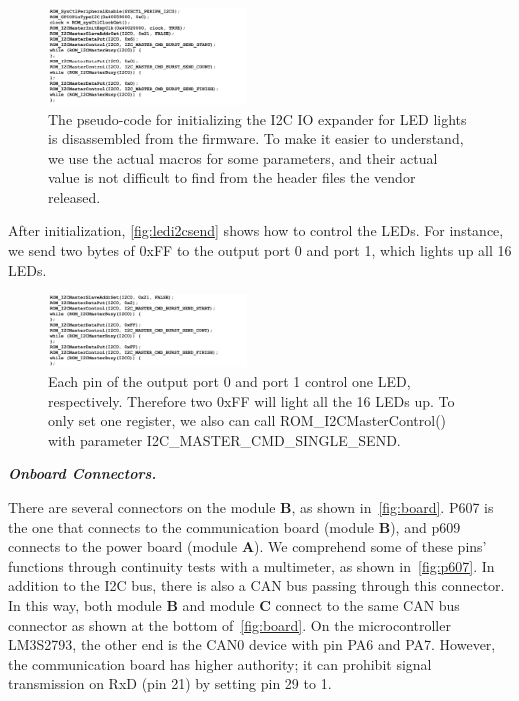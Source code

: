 \begin{figure}[th]
	\includegraphics[width=0.47\textwidth]{figures/ledi2cinit}
	\centering
	\caption{The pseudo-code for initializing the I2C IO expander for LED lights is disassembled from the firmware. To make it easier to understand, we use the actual macros for some parameters, and their actual value is not difficult to find from the header files the vendor released.}
	\label{fig:ledi2cinit}
\end{figure}



After initialization, \autoref{fig:ledi2csend} shows how to control the LEDs. For instance, we send two bytes of 0xFF to the output port 0 and port 1, which lights up all 16 LEDs.


\begin{figure}[th]
	\includegraphics[width=0.47\textwidth]{figures/ledi2csend}
	\centering
	\caption{Each pin of the output port 0 and port 1 control one LED, respectively. Therefore two 0xFF will light all the 16 LEDs up. To only set one register, we also can call  ROM\_I2CMasterControl() with parameter I2C\_MASTER\_CMD\_SINGLE\_SEND.}
	\label{fig:ledi2csend}
\end{figure}





\textbf{\textit{Onboard Connectors.}}

There are several connectors on the module \textbf{B}, as shown in~\autoref{fig:board}. P607 is the one that connects to the communication board (module \textbf{B}), and p609 connects to the power board (module \textbf{A}). We comprehend some of these pins' functions through continuity tests with a multimeter, as shown in~\autoref{fig:p607}. In addition to the I2C bus, there is also a CAN bus passing through this connector. In this way, both module \textbf{B} and module \textbf{C} connect to the same CAN bus connector as shown at the bottom of~\autoref{fig:board}. On the microcontroller LM3S2793, the other end is the CAN0 device with pin PA6 and PA7. However, the communication board has higher authority; it can prohibit signal transmission on RxD (pin 21) by setting pin 29 to 1.

